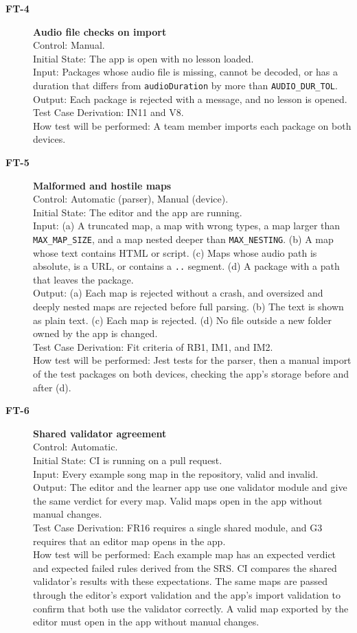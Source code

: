 \documentclass[12pt, titlepage]{article}
\newcommand{\tid}[1]{\hypertarget{test:#1}{\textbf{#1}}}
\newcommand{\cn}[1]{\texttt{#1}}
\begin{document}
\begin{description}
\item[\tid{FT-4}] \textbf{Audio file checks on import}\\
Control: Manual.\\
Initial State: The app is open with no lesson loaded.\\
Input: Packages whose audio file is missing, cannot be decoded, or has a
duration that differs from \texttt{audioDuration} by more than
\cn{AUDIO\_DUR\_TOL}.\\
Output: Each package is rejected with a message, and no lesson is opened.\\
Test Case Derivation: IN11 and V8.\\
How test will be performed: A team member imports each package on both
devices.

\item[\tid{FT-5}] \textbf{Malformed and hostile maps}\\
Control: Automatic (parser), Manual (device).\\
Initial State: The editor and the app are running.\\
Input: (a) A truncated map, a map with wrong types, a map larger than
\cn{MAX\_MAP\_SIZE}, and a map nested deeper than \cn{MAX\_NESTING}. (b) A map
whose text contains HTML or script. (c) Maps whose audio path is absolute, is a
URL, or contains a \texttt{..} segment. (d) A package with a path that leaves the
package.\\
Output: (a) Each map is rejected without a crash, and oversized and deeply
nested maps are rejected before full parsing. (b) The text is shown as plain
text. (c) Each map is rejected. (d) No file outside a new folder owned by the
app is changed.\\
Test Case Derivation: Fit criteria of RB1, IM1, and IM2.\\
How test will be performed: Jest tests for the parser, then a manual import of
the test packages on both devices, checking the app's storage before and after
(d).

\item[\tid{FT-6}] \textbf{Shared validator agreement}\\
Control: Automatic.\\
Initial State: CI is running on a pull request.\\
Input: Every example song map in the repository, valid and invalid.\\
Output: The editor and the learner app use one validator module and give the
same verdict for every map. Valid maps open in the app without manual changes.\\
Test Case Derivation: FR16 requires a single shared module, and G3 requires that
an editor map opens in the app.\\
How test will be performed: Each example map has an expected verdict and
expected failed rules derived from the SRS. CI compares the shared
validator's results with these expectations. The same maps are passed
through the editor's export validation and the app's import validation
to confirm that both use the validator correctly. A valid map exported
by the editor must open in the app without manual changes.

\end{description}
\end{document}
